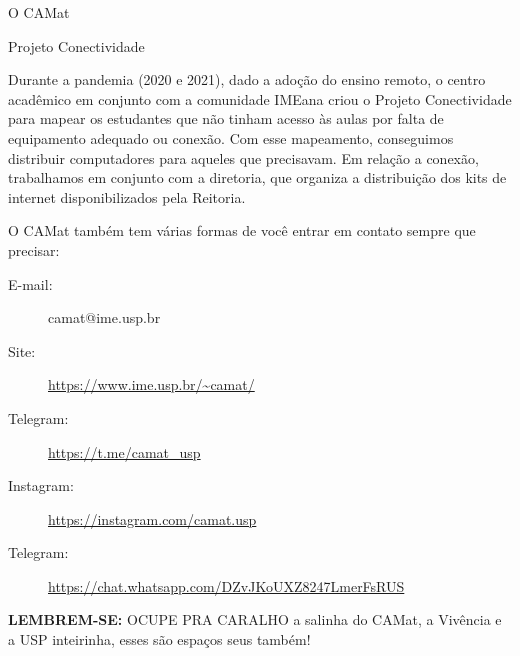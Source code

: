 \begin{secao}{O CAMat}
\begin{subsecao}{Projeto Conectividade}

Durante a pandemia (2020 e 2021), dado a adoção do ensino remoto, o centro acadêmico em conjunto 
com a comunidade IMEana criou o Projeto Conectividade para mapear os estudantes que não tinham acesso
às aulas por falta de equipamento adequado ou conexão. Com esse mapeamento, conseguimos distribuir 
computadores para aqueles que precisavam. Em relação a conexão, trabalhamos em conjunto com a diretoria, 
que organiza a distribuição dos kits de internet disponibilizados pela Reitoria.

\end{subsecao}

O CAMat também tem várias formas de você entrar em contato sempre que precisar:

\begin{description}
\item [E-mail:] camat@ime.usp.br
\item [Site:] \url{https://www.ime.usp.br/~camat/}
\item [Telegram:] \url{https://t.me/camat_usp}
\item [Instagram:] \url{https://instagram.com/camat.usp}
\item [Telegram:] \url{https://chat.whatsapp.com/DZvJKoUXZ8247LmerFsRUS}
\end{description}

\textbf{LEMBREM-SE:} OCUPE PRA CARALHO a salinha do CAMat, a Vivência e a USP inteirinha, esses são espaços seus também!


\end{secao}
